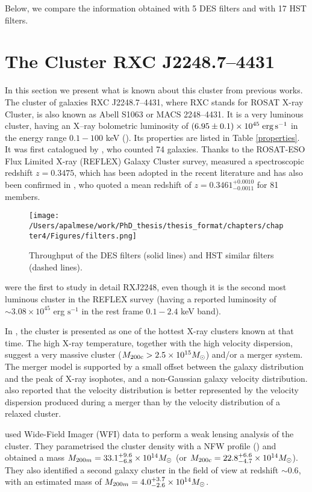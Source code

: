 {Below, we compare the information obtained with 5 DES filters and with 17 HST filters.

\section{The Cluster RXC J2248.7--4431}\label{previousworks}
In this section we present what is known about this cluster from previous works. The cluster of galaxies RXC J2248.7--4431, where RXC stands for ROSAT X-ray Cluster, is also known as Abell S1063 or MACS 2248--4431. It is a very luminous cluster, having an X--ray bolometric luminosity of $(6.95 \pm 0.1)\times 10^{45}\; {\rm erg\, s^{-1}}$ in the energy range $0.1-100$ keV (\citealt{maughan08}). Its properties are listed in Table \ref{properties}. It  was first catalogued by \citet{abell}, who counted 74 galaxies. Thanks to the ROSAT-ESO Flux Limited X-ray (REFLEX) Galaxy Cluster survey, \citet{bohr} measured a spectroscopic redshift $z=0.3475$, which has been adopted in the recent literature and has also been confirmed in \citet{gomez}, who quoted a mean redshift of $z=0.3461^{+0.0010}_{-0.0011}$ for 81 members.

\begin{figure}
\centering
\texttt{[image: /Users/apalmese/work/PhD\_thesis/thesis\_format/chapters/chapter4/Figures/filters.png]}\caption{Throughput of the DES filters (solid lines) and HST similar filters (dashed lines).}\label{filters}
\end{figure}

\citet{gomez} were the first to study in detail RXJ2248, even though it is the second most luminous cluster in the REFLEX survey (having a reported luminosity of $\sim 3.08 \times 10^{45}$ erg $\mathrm{s}^{-1}$ in the rest frame $0.1-2.4$ keV band). 

In \citet{gomez}, the cluster is presented as one of the hottest X-ray clusters known at that time. The high X-ray temperature, together with the high velocity dispersion, suggest a very massive cluster ($M_{200\mathrm{c}}>2.5 \times 10^{15} \mbox{$M_{\odot}$}$) and/or a merger system. The merger model is supported by a small offset between the galaxy distribution and the peak of X-ray isophotes, and a non-Gaussian galaxy velocity distribution. \citet{gomez} also reported that the velocity distribution is better represented by the velocity dispersion produced during a merger than by the velocity distribution of a relaxed cluster.

\citet{gruen} used Wide-Field Imager (WFI) data to perform a weak lensing analysis of the cluster. They parametrised the cluster density with a NFW profile (\citealt{nfw}) and obtained a mass $M_{200m}=33.1^{+9.6}_{-6.8}\times 10^{14}\mbox{$M_{\odot}$}$ (or $M_{200c} = 22.8 ^{+6.6}_{-4.7}\times 10^{14} \mbox{$M_{\odot}$}$). They also identified a second galaxy cluster in the field of view at redshift $\sim 0.6$, with an estimated mass of $M_{200m}=4.0^{+3.7}_{-2.6}\times10^{14}\mbox{$M_{\odot}$}$.

}
